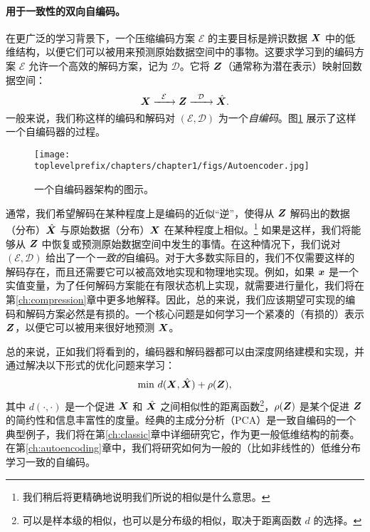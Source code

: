 \documentclass[../../book-main.tex]{subfiles}
\begin{document}
\paragraph{用于一致性的双向自编码。}
在更广泛的学习背景下，一个压缩编码方案 $\mathcal{E}$ 的主要目标是辨识数据 $\bm{X}$ 中的低维结构，以便它们可以被用来预测原始数据空间中的事物。这要求学习到的编码方案 $\mathcal{E}$ 允许一个高效的解码方案，记为 $\mathcal D$。它将 $\bm{Z}$（通常称为潜在表示）映射回数据空间：
\begin{equation}
    \bm{X}   \xrightarrow{\hspace{2mm} \mathcal{E}\hspace{2mm}} \bm{Z}  \xrightarrow{\hspace{2mm} \mathcal{D} \hspace{2mm}} \hat {\bm{X}}.
       \label{eqn:auto-encoding}
\end{equation}
一般来说，我们称这样的编码和解码对 $(\mathcal{E}, \mathcal{D})$ 为一个{\em 自编码}。图\ref{fig:autoencoder}
展示了这样一个自编码器的过程。
\begin{figure}
    \centering
    \texttt{[image: \\toplevelprefix/chapters/chapter1/figs/Autoencoder.jpg]}
    \caption{一个自编码器架构的图示。}
    \label{fig:autoencoder}
\end{figure}


通常，我们希望解码在某种程度上是编码的近似“逆”，使得从 $\bm{Z}$ 解码出的数据（分布）$\hat {\bm{X}}$ 与原始数据（分布）$\bm{X}$ 在某种程度上相似。\footnote{我们稍后将更精确地说明我们所说的相似是什么意思。} 如果是这样，我们将能够从 $\bm{Z}$ 中恢复或预测原始数据空间中发生的事情。在这种情况下，我们说对 $(\mathcal{E}, \mathcal{D})$ 给出了一个{\em 一致的}自编码。对于大多数实际目的，我们不仅需要这样的解码存在，而且还需要它可以被高效地实现和物理地实现。例如，如果 $\bm{x}$ 是一个实值变量，为了任何解码方案能在有限状态机上实现，就需要进行量化，我们将在第\ref{ch:compression}章中更多地解释。因此，总的来说，我们应该期望可实现的编码和解码方案必然是有损的。一个核心问题是如何学习一个紧凑的（有损的）表示 $\bm{Z}$，以便它可以被用来很好地预测 $\bm{X}$。

总的来说，正如我们将看到的，编码器和解码器都可以由深度网络建模和实现，并通过解决以下形式的优化问题来学习：
\begin{equation}
   \min \, d( \bm{X}, \hat {\bm{X}}) + \rho(\bm{Z}), 
   \label{eqn:auto-encoding-objective}
\end{equation}
其中 $d(\cdot, \cdot)$ 是一个促进 $\bm{X}$ 和 $\hat {\bm{X}}$ 之间相似性的距离函数\footnote{可以是样本级的相似，也可以是分布级的相似，取决于距离函数 $d$ 的选择。}，$\rho(\bm{Z})$ 是某个促进 $\bm{Z}$ 的简约性和信息丰富性的度量。经典的主成分分析（PCA）\cite{JolliffeI2002}是一致自编码的一个典型例子，我们将在第\ref{ch:classic}章中详细研究它，作为更一般低维结构的前奏。在第\ref{ch:autoencoding}章中，我们将研究如何为一般的（比如非线性的）低维分布学习一致的自编码。
\end{document}
